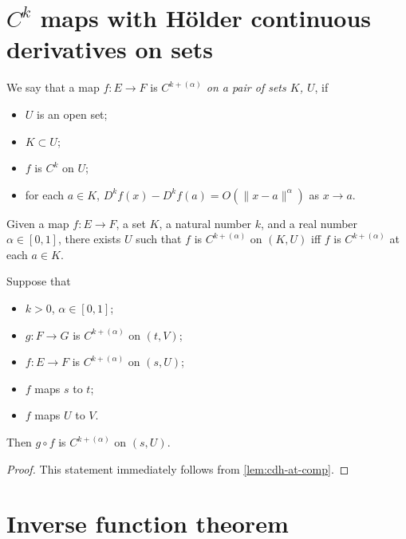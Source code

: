 \section{\(C^{k}\) maps with Hölder continuous derivatives on sets}%
\label{sec:chd-on}

\begin{definition}%
  \label{def:cdh-on}
  We say that a map \(f\colon E\to F\) is \emph{\(C^{k+(\alpha)}\) on a pair of sets \(K\), \(U\)}, if
  \begin{itemize}
  \item \(U\) is an open set;
  \item \(K \subset U\);
  \item \(f\) is \(C^{k}\) on \(U\);
  \item for each \(a \in K\), \(D^{k}f(x) - D^{k}f(a) = O(\|x - a\|^{\alpha})\) as \(x\to a\).
  \end{itemize}
\end{definition}

\begin{lemma}%
  \label{lem:exists-cdh-on}
  Given a map \(f\colon E \to F\), a set \(K\), a natural number \(k\), and a real number \(\alpha \in [0, 1]\),
  there exists \(U\) such that \(f\) is \(C^{k+(\alpha)}\) on \((K, U)\)
  iff \(f\) is \(C^{k+(\alpha)}\) at each \(a \in K\).
\end{lemma}

\begin{lemma}%
  \label{lem:cdh-on-comp}
  Suppose that
  \begin{itemize}
  \item \(k > 0\), \(\alpha \in [0, 1]\);
  \item \(g\colon F\to G\) is \(C^{k+(\alpha)}\) on \((t, V)\);
  \item \(f\colon E\to F\) is \(C^{k+(\alpha)}\) on \((s, U)\);
  \item \(f\) maps \(s\) to \(t\);
  \item \(f\) maps \(U\) to \(V\).
  \end{itemize}
  Then \(g\circ f\) is \(C^{k+(\alpha)}\) on \((s, U)\).
\end{lemma}

\begin{proof}
  This statement immediately follows from \autoref{lem:cdh-at-comp}.
\end{proof}

\section{Inverse function theorem}%
\label{sec:inverse-funct-theor}

